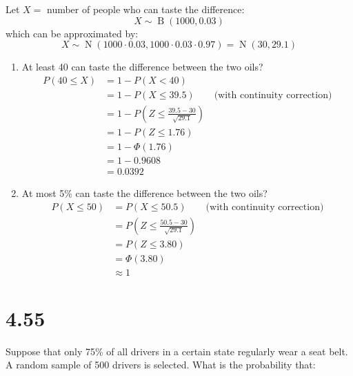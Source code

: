 \documentclass[letterpaper,12pt,fleqn]{article}
\renewcommand{\O}{\Phi}
\DeclareMathOperator{\nord}{N}
\DeclareMathOperator{\bind}{B}
\begin{document}
Let \(X=\) number of people who can taste the difference:
\[X\sim\bind(1000,0.03)\]
which can be approximated by:
\[X\sim\nord(1000\cdot0.03,1000\cdot0.03\cdot0.97)=\nord(30,29.1)\]
\begin{enumerate}[label={\alph*)}]
\item At least 40 can taste the difference between the two oils?
  \begin{align*}
    P(40\le X) &= 1-P(X<40) \\
    &= 1-P(X\le39.5)\qquad\text{(with continuity correction)} \\
    &= 1-P\left(Z\le\frac{39.5-30}{\sqrt{29.1}}\right) \\
    &= 1-P(Z\le1.76) \\
    &= 1-\O(1.76) \\
    &= 1-0.9608 \\
    &= 0.0392
  \end{align*}
\item At most 5\% can taste the difference between the two oils?
  \begin{align*}
    P(X\le50) &= P(X\le50.5)\qquad\text{(with continuity correction)} \\
    &= P\left(Z\le\frac{50.5-30}{\sqrt{29.1}}\right) \\
    &= P(Z\le3.80) \\
    &= \O(3.80) \\
    &\approx1
  \end{align*}
\end{enumerate}

\section*{4.55}

Suppose that only 75\% of all drivers in a certain state regularly wear a seat belt.  A random sample of 500 drivers is
selected.  What is the probability that:
\end{document}
